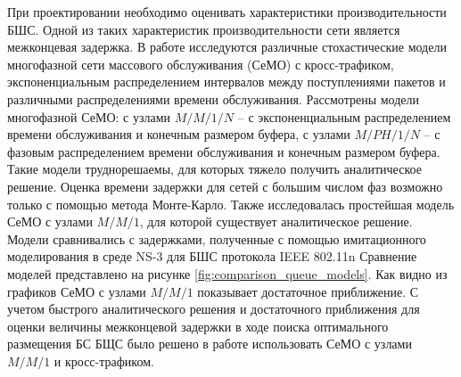 



При проектировании необходимо оценивать характеристики производительности БШС.
Одной из таких характеристик производительности сети является межконцевая задержка. В работе исследуются различные стохастические модели многофазной сети массового обслуживания (СеМО) с кросс-трафиком, экспоненциальным распределением интервалов между поступлениями пакетов и различными распределениями времени обслуживания. Рассмотрены модели многофазной СеМО: с узлами $M/M/1/N$ -- с экспоненциальным распределением времени обслуживания и конечным размером буфера, с узлами $M/PH/1/N$ -- с фазовым распределением времени обслуживания и конечным размером буфера. Такие модели труднорешаемы, для которых тяжело получить аналитическое решение. Оценка времени задержки для сетей с большим числом фаз возможно только с помощью метода Монте-Карло. Также исследовалась простейшая модель СеМО с узлами $M/M/1$, для которой существует аналитическое решение. Модели сравнивались с задержками, полученные с помощью имитационного моделирования в среде NS-3 для БШС протокола IEEE 802.11n Сравнение моделей представлено на рисунке \cref{fig:comparison_queue_models}. Как видно из графиков СеМО с узлами $M/M/1$ показывает достаточное приближение. С учетом быстрого аналитического решения и достаточного приближения для оценки величины межконцевой задержки в ходе поиска оптимального размещения БС БЩС было решено в работе использовать СеМО с узлами $M/M/1$ и кросс-трафиком.





